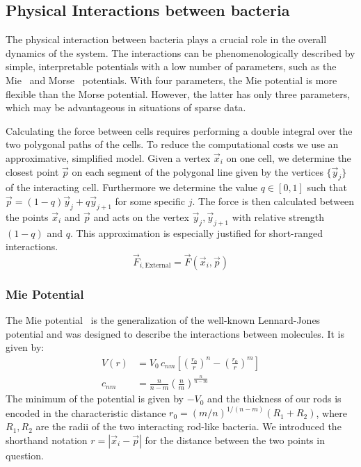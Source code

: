 \subsection{Physical Interactions between bacteria}
The physical interaction between bacteria plays a crucial role in the overall dynamics of the
system.
The interactions can be phenomenologically described by simple, interpretable potentials with a low
number of parameters, such as the
Mie~\cite{Mie1903} and Morse~\cite{Morse1929,Kang2014,Breitwieser2021} potentials.
With four parameters, the Mie potential is more flexible than the Morse potential.
However, the latter has only three parameters, which may be advantageous in situations of sparse
data.

Calculating the force between cells requires performing a double integral over the two polygonal
paths of the cells.
To reduce the computational costs we use an approximative, simplified model.
Given a vertex $\vec{x}_i$ on one cell, we determine the closest point $\vec{p}$ on each segment of
the polygonal line given by the vertices $\{\vec{y}_j\}$ of the interacting cell.
Furthermore we determine the value $q\in[0,1]$ such that $\vec{p} = (1-q)\vec{y}_j + q\vec{y}_{j+1}$
for some specific $j$.
The force is then calculated between the points $\vec{x}_i$ and $\vec{p}$ and acts on the vertex
$\vec{y}_j,\vec{y}_{j+1}$ with relative strength $(1-q)$ and $q$.
This approximation is especially justified for short-ranged interactions.
\begin{equation}
    \vec{F}_{i,\text{External}} = \vec{F}(\vec{x}_i,\vec{p})
\end{equation}
\subsubsection{Mie Potential}

The Mie potential~\cite{Mie1903} is the generalization of the well-known
Lennard-Jones~\cite{Jones1924} potential and was designed to describe the interactions between
molecules.
It is given by:
\begin{align}
    V(r) &= V_0\,c_{nm}\left[ \left(\frac{r_0}{r}\right)^n -
        \left(\frac{r_0}{r}\right)^m\right]\\
    c_{nm} &= \frac{n}{n-m}\left(\frac{n}{m}\right)^{\frac{n}{n-m}}
\end{align}
The minimum of the potential is given by $-V_0$ and the thickness of our rods is encoded in the
characteristic distance $r_0 = (m/n)^{1/(n-m)}(R_1+R_2)$, where $R_1,R_2$ are the radii of the two
interacting rod-like bacteria.
We introduced the shorthand notation $r=|\vec{x}_i - \vec{p}|$ for the distance between the two
points in question.

